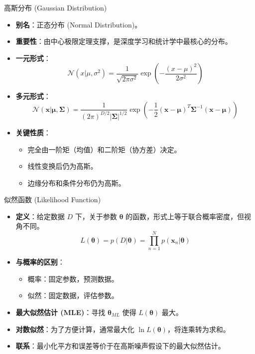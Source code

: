 \documentclass[12pt, aspectratio=169]{beamer}
\newcommand{\vect}[1]{\mathbf{#1}}
\newcommand{\N}{\mathcal{N}}
\begin{document}
\begin{frame}{高斯分布 (Gaussian Distribution)}
    \begin{itemize}
        \item \textbf{别名}：正态分布 (Normal Distribution)。
        \item \textbf{重要性}：由中心极限定理支撑，是深度学习和统计学中最核心的分布。
        \item \textbf{一元形式}：
        $$ \N(x|\mu, \sigma^2) = \frac{1}{\sqrt{2\pi\sigma^2}} \exp\left(-\frac{(x-\mu)^2}{2\sigma^2}\right) $$
        \item \textbf{多元形式}：
        $$ \N(\vect{x}|\boldsymbol{\mu}, \boldsymbol{\Sigma}) = \frac{1}{(2\pi)^{D/2}|\boldsymbol{\Sigma}|^{1/2}} \exp\left(-\frac{1}{2}(\vect{x}-\boldsymbol{\mu})^T\boldsymbol{\Sigma}^{-1}(\vect{x}-\boldsymbol{\mu})\right) $$
        \item \textbf{关键性质}：
        \begin{itemize}
            \item 完全由一阶矩（均值）和二阶矩（协方差）决定。
            \item 线性变换后仍为高斯。
            \item 边缘分布和条件分布仍为高斯。
        \end{itemize}
    \end{itemize}
\end{frame}

\begin{frame}{似然函数 (Likelihood Function)}
    \begin{itemize}
        \item \textbf{定义}：给定数据 $D$ 下，关于参数 $\boldsymbol{\theta}$ 的函数，形式上等于联合概率密度，但视角不同。
        $$ L(\boldsymbol{\theta}) = p(D|\boldsymbol{\theta}) = \prod_{n=1}^N p(\vect{x}_n|\boldsymbol{\theta}) $$
        \item \textbf{与概率的区别}：
        \begin{itemize}
            \item 概率：固定参数，预测数据。
            \item 似然：固定数据，评估参数。
        \end{itemize}
        \item \textbf{最大似然估计 (MLE)}：寻找 $\boldsymbol{\theta}_{ML}$ 使得 $L(\boldsymbol{\theta})$ 最大。
        \item \textbf{对数似然}：为了方便计算，通常最大化 $\ln L(\boldsymbol{\theta})$，将连乘转为求和。
        \item \textbf{联系}：最小化平方和误差等价于在高斯噪声假设下的最大似然估计。
    \end{itemize}
\end{frame}
\end{document}
